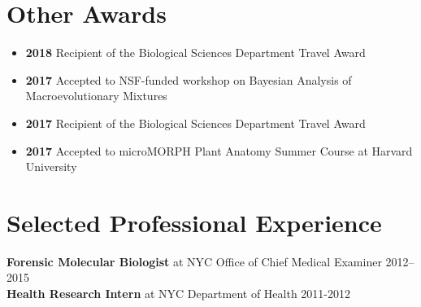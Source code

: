 \documentclass[]{article}
\begin{document}
\vspace{1mm}



\section{\fontsize{16}{48}\selectfont Other Awards}

\begin{itemize}[label=$\mathwitch*$]
\item{\textbf{2018} Recipient of the Biological Sciences Department Travel Award}
\item{\textbf{2017} Accepted to NSF-funded workshop on Bayesian Analysis of Macroevolutionary Mixtures \href{http://bamm-project.org/index.html}{\faLink}}
\item{\textbf{2017} Recipient of the Biological Sciences Department Travel Award}
\item{\textbf{2017} Accepted to microMORPH Plant Anatomy Summer Course at Harvard University \href{https://web.archive.org/web/20170922060558/http://arboretum.harvard.edu/tracing-evolution-form-function/}{\faLink}}
\end{itemize}
\vspace{2mm}

\section{\fontsize{16}{48}\selectfont Selected Professional Experience}

\textbf{Forensic Molecular Biologist} at NYC Office of Chief Medical Examiner \hfill 2012--2015\\
   
\textbf{Health Research Intern} at NYC Department of Health \hfill 2011-2012\\
     
\end{document}

